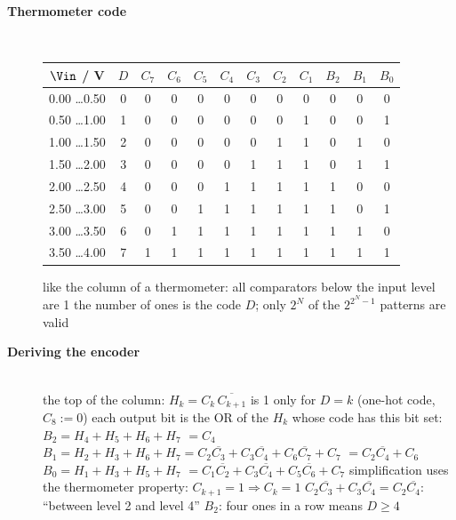 \begin{description}
\item[{\rot\bf Thermometer code}]~\\[-\lblskip]
\begin{center}
\small
\begin{tabular}{cc|ccccccc|ccc}
\toprule
$\Vin$ / V & $D$ & $C_7$ & $C_6$ & $C_5$ & $C_4$ & $C_3$ & $C_2$ & $C_1$ & $B_2$ & $B_1$ & $B_0$\\
\midrule
0.00 \ldots 0.50 & 0 & 0&0&0&0&0&0&0 & 0&0&0\\
0.50 \ldots 1.00 & 1 & 0&0&0&0&0&0&1 & 0&0&1\\
1.00 \ldots 1.50 & 2 & 0&0&0&0&0&1&1 & 0&1&0\\
1.50 \ldots 2.00 & 3 & 0&0&0&0&1&1&1 & 0&1&1\\
2.00 \ldots 2.50 & 4 & 0&0&0&1&1&1&1 & 1&0&0\\
2.50 \ldots 3.00 & 5 & 0&0&1&1&1&1&1 & 1&0&1\\
3.00 \ldots 3.50 & 6 & 0&1&1&1&1&1&1 & 1&1&0\\
3.50 \ldots 4.00 & 7 & 1&1&1&1&1&1&1 & 1&1&1\\
\bottomrule
\end{tabular}
\end{center}
\bi
	\ite like the column of a thermometer: all comparators below the input level are 1
	\ite the number of ones is the code $D$; only $2^N$ of the $2^{2^N-1}$ patterns are valid
\ei
\os{\newpage}

\item[{\rot\bf Deriving the encoder}]~\\[-\lblskip]
\bi
	\ite the top of the column: $H_k = C_k\,\overline{C_{k+1}}$ is 1 only for $D = k$ (one-hot code, $C_8 := 0$)
	\ite each output bit is the OR of the $H_k$ whose code has this bit set:
	\bi
		\itee $B_2 = H_4 + H_5 + H_6 + H_7$ \hfill $= C_4$
		\itee $B_1 = H_2 + H_3 + H_6 + H_7 = C_2\overline{C_3} + C_3\overline{C_4} + C_6\overline{C_7} + C_7$ \hfill $= C_2\overline{C_4} + C_6$
		\itee $B_0 = H_1 + H_3 + H_5 + H_7$ \hfill $= C_1\overline{C_2} + C_3\overline{C_4} + C_5\overline{C_6} + C_7$
	\ei
	\ite simplification uses the thermometer property: $C_{k+1} = 1 \Rightarrow C_k = 1$
	\bi
		\itee $C_2\overline{C_3} + C_3\overline{C_4} = C_2\overline{C_4}$: ``between level 2 and level 4''
		\itee $B_2$: four ones in a row means $D \geq 4$
	\ei
\ei
{}
\os{\newpage}


\end{description}
